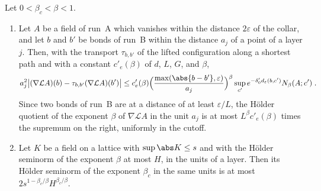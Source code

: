 

\begin{lemma}\label{lem:lift-holder}
Let $0 < \beta_c < \beta < 1$.
\begin{enumerate}[label=(\alph*)]
\item Let $A$ be a field of run~A which vanishes within the distance $2\varepsilon$ of the collar, and let $b$ and $b'$ be bonds of run~B within the distance $a_j$ of a point of a layer $j$. Then, with the transport $\tau_{b,b'}$ of the lifted configuration along a shortest path and with a constant $c'_e(\beta)$ of $d$, $L$, $G$, and $\beta$,
\[
    a_j^2\bigl\lvert(\nabla\mathcal LA)(b) - \tau_{b,b'}(\nabla\mathcal LA)(b')\bigr\rvert \leq c'_e(\beta)\Bigl(\frac{\max(\abs{b - b'}, \varepsilon)}{a_j}\Bigr)^\beta\sup_{c'}e^{-\delta'_0d_\varepsilon(b,c')}N_\beta(A; c')\;.
\]
Since two bonds of run~B are at a distance of at least $\varepsilon/L$, the H\"older quotient of the exponent $\beta$ of $\nabla\mathcal LA$ in the unit $a_j$ is at most $L^\beta c'_e(\beta)$ times the supremum on the right, uniformly in the cutoff.
\item Let $K$ be a field on a lattice with $\sup\abs K \leq s$ and with the H\"older seminorm of the exponent $\beta$ at most $H$, in the units of a layer. Then its H\"older seminorm of the exponent $\beta_c$ in the same units is at most $2s^{1-\beta_c/\beta}H^{\beta_c/\beta}$.
\end{enumerate}
\end{lemma}


